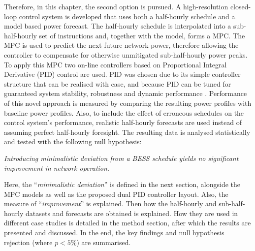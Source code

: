 Therefore, in this chapter, the second option is pursued.
A high-resolution closed-loop control system is developed that uses both a half-hourly schedule and a model based power forecast.
The half-hourly schedule is interpolated into a sub-half-hourly set of instructions and, together with the model, forms a MPC.
The MPC is used to predict the next future network power, therefore allowing the controller to compensate for otherwise unmitigated sub-half-hourly power peaks.
To apply this MPC two on-line controllers based on Proportional Integral Derivative (PID) control are used.
PID was chosen due to its simple controller structure that can be realised with ease, and because PID can be tuned for guaranteed system stability, robustness and dynamic performance \cite{Rasoanarivo2013, Jianbo2007, Betin2006, Algaddafi2016}.
Performance of this novel approach is measured by comparing the resulting power profiles with baseline power profiles.
Also, to include the effect of erroneous schedules on the control system's performance, realistic half-hourly forecasts are used instead of assuming perfect half-hourly foresight.
The resulting data is analysed statistically and tested with the following null hypothesis:

\textit{Introducing minimalistic deviation from a BESS schedule yields no significant improvement in network operation.}

Here, the ``\textit{minimalistic deviation}'' is defined in the next section, alongside the MPC models as well as the proposed dual PID controller layout.
Also, the measure of ``\textit{improvement}'' is explained.
Then how the half-hourly and sub-half-hourly datasets and forecasts are obtained is explained.
How they are used in different case studies is detailed in the method section, after which the results are presented and discussed.
In the end, the key findings and null hypothesis rejection (where $p<5\%$) are summarised.
